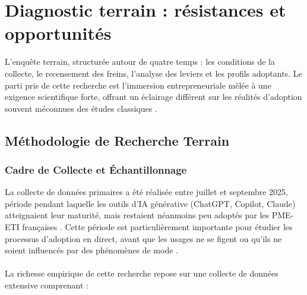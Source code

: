 \chapter{Diagnostic terrain : résistances et opportunités}
\label{chap:field_diagnosis}

L'enquête terrain, structurée autour de quatre temps : les conditions de la collecte, le recensement des freins, l'analyse des leviers et les profils adoptants. Le parti pris de cette recherche est l'immersion entrepreneuriale mêlée à une exigence scientifique forte, offrant un éclairage différent sur les réalités d'adoption souvent méconnues des études classiques \cite{yin2018case}.

\section{Méthodologie de Recherche Terrain}

\subsection{Cadre de Collecte et Échantillonnage}

La collecte de données primaires a été réalisée entre juillet et septembre 2025, période pendant laquelle les outils d’IA générative (ChatGPT, Copilot, Claude) atteignaient leur maturité, mais restaient néanmoins peu adoptés par les PME-ETI françaises \cite{bpifrance2025ia}. Cette période est particulièrement importante pour étudier les processus d’adoption en direct, avant que les usages ne se figent ou qu’ils ne soient influencés par des phénomènes de mode \cite{rogers2003diffusion}.
\\\\
La richesse empirique de cette recherche repose sur une collecte de données extensive comprenant :

